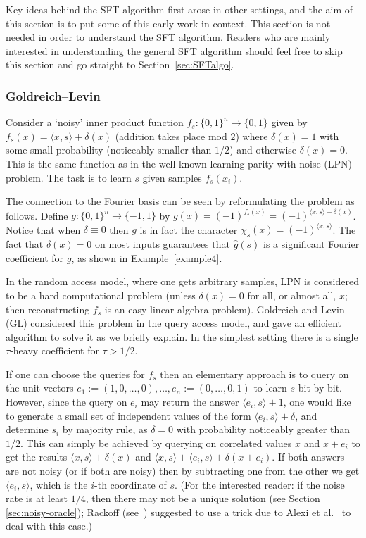 \documentclass[11pt]{article}
\theoremstyle{definition}
\begin{document}
Key ideas behind the SFT algorithm first arose in other settings, and the aim of this section is to put some of this early work in context. This section is not needed in order to understand the SFT algorithm. Readers who are mainly interested in understanding the general SFT algorithm should feel free to skip this section and go straight to Section~\ref{sec:SFTalgo}.

\subsubsection{Goldreich--Levin} \label{sec:GL}

Consider a `noisy' inner product function $f_s: \{0,1\}^n \to \{0,1\}$ given by $f_s(x) = \langle x, s \rangle + \delta(x)$ (addition takes place mod $2$) where $\delta(x) = 1$ with some small probability (noticeably smaller than $1/2$) and otherwise $\delta(x) = 0$.
This is the same function as in the well-known learning parity with noise (LPN) problem.
The task is to learn $s$ given samples $f_s(x_i)$.

The connection to the Fourier basis can be seen by reformulating the problem as follows. Define $g: \{0,1\}^n \to \{-1,1\}$ by $g(x) = (-1)^{f_s(x)} = (-1)^{\langle x, s \rangle + \delta(x)}$. Notice that when $\delta \equiv 0$ then $g$ is in fact the character $\chi_s(x) = (-1)^{\langle x, s \rangle}$. The fact that $\delta(x)=0$ on most inputs guarantees that $\widehat{g}(s)$ is a significant Fourier coefficient for $g$, as shown in Example~\ref{example4}.

In the random access model, where one gets arbitrary samples, LPN is considered to be a hard computational problem (unless $\delta(x) = 0$ for all, or almost all, $x$; then reconstructing $f_s$ is an easy linear algebra problem).
Goldreich and Levin~\cite{GL} (GL) considered this problem in the query access model, and gave an efficient algorithm to solve it as we briefly explain. In the simplest setting there is a single $\tau$-heavy coefficient for $\tau > 1/2$.

If one can choose the queries for $f_s$ then an elementary approach is to query on the unit vectors $e_1 := (1,0,\dots,0), \dots, e_n := (0,\dots,0,1)$ to learn $s$ bit-by-bit. However, since the query on $e_i$ may return the answer $\langle e_i, s \rangle + 1$, one would like to generate a small set of independent values of the form $\langle e_i, s \rangle + \delta$, and determine $s_i$ by majority rule, as $\delta=0$ with probability noticeably greater than $1/2$. This can simply be achieved by querying on correlated values $x$ and $x + e_i$ to get the results $\langle x, s \rangle + \delta(x)$ and $\langle x, s \rangle + \langle e_i, s \rangle + \delta(x+e_i)$. If both answers are not noisy (or if both are noisy) then by subtracting one from the other we get $\langle e_i, s \rangle$, which is the $i$-th coordinate of $s$.
(For the interested reader: if the noise rate is at least $1/4$, then there may not be a unique solution (see Section \ref{sec:noisy-oracle}); Rackoff (see~\cite[Section C.2]{Rackoff}) suggested to use a trick due to Alexi et al.~\cite{ACGS} to deal with this case.)
\end{document}
